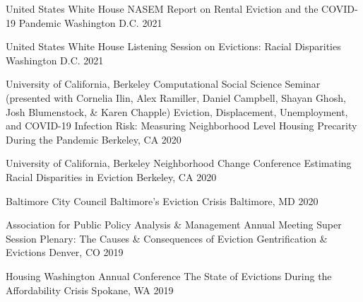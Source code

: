 


\begin{cventries}

  \cventry
    {United States White House} %
    {NASEM Report on Rental Eviction and the COVID-19 Pandemic} %
    {Washington D.C.} %
    {2021} %
    {}

  \cventry
    {United States White House} %
    {Listening Session on Evictions: Racial Disparities} %
    {Washington D.C.} %
    {2021} %
    {}

  \cventry
    {University of California, Berkeley Computational Social Science Seminar (presented with Cornelia Ilin, Alex Ramiller, Daniel Campbell, Shayan Ghosh, Josh Blumenstock, \& Karen Chapple)} %
    {Eviction, Displacement, Unemployment, and COVID-19 Infection Risk: Measuring Neighborhood Level Housing Precarity During the Pandemic} %
    {Berkeley, CA} %
    {2020} %
    {}

  \cventry
    {University of California, Berkeley Neighborhood Change Conference} %
    {Estimating Racial Disparities in Eviction} %
    {Berkeley, CA} %
    {2020} %
    {}

  \cventry
    {Baltimore City Council} %
    {Baltimore's Eviction Crisis} %
    {Baltimore, MD} %
    {2020} %
    {}

  \cventry
    {Association for Public Policy Analysis \& Management Annual Meeting Super Session Plenary: The Causes \& Consequences of Eviction} %
    {Gentrification \& Evictions} %
    {Denver, CO} %
    {2019} %
    {}

  \cventry
    {Housing Washington Annual Conference} %
    {The State of Evictions During the Affordability Crisis} %
    {Spokane, WA} %
    {2019} %
    {}


\end{cventries}
